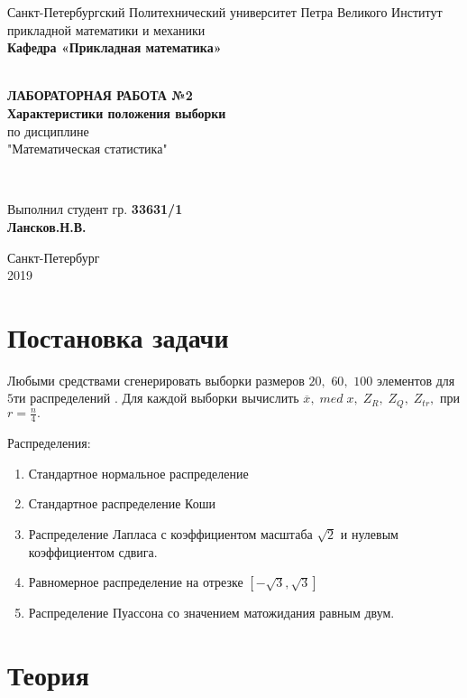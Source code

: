 \documentclass[12pt]{article}
\begin{document}
\begin{titlepage}
	\center
		Санкт-Петербургский Политехнический 
		университет Петра Великого
		Институт прикладной математики и механики
		\\ \textbf{Кафедра «Прикладная математика»}

	\vfill ~
	\textbf{
		\\ \large ЛАБОРАТОРНАЯ РАБОТА №2
		\\	\normalsize	
			Характеристики положения выборки
	}
	\\	по дисциплине 
	\\	"Математическая статистика"

	\vfill ~

	Выполнил студент гр. \textbf{33631/1} \\
	\textbf{Лансков.Н.В.} \\ 

\vfill

{\large}	Санкт-Петербург
\\ 2019
\end{titlepage}

\tableofcontents
\newpage
\listoftables
\newpage
\pagebreak


\section{Постановка задачи}
Любыми средствами сгенерировать выборки размеров $20,$ $60,$ $100$ элементов для $5$ти распределений \cite{distr_formulas}. Для каждой выборки вычислить $\overline{x},\; med\; x,\; Z_R,\; Z_Q,\; Z_{tr},$ при $r = \frac{n}{4}.$

Распределения:
\begin{enumerate}
\item Стандартное нормальное распределение
\item Стандартное распределение Коши
\item Распределение Лапласа с коэффициентом масштаба $\sqrt{2}$ и нулевым коэффициентом сдвига.
\item Равномерное распределение на отрезке $\left[-\sqrt{3}, \sqrt{3}\right]$
\item Распределение Пуассона со значением матожидания равным двум.
\end{enumerate}

\section{Теория}
\end{document}
